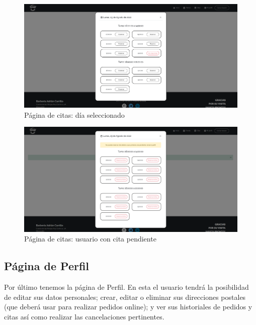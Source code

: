 \begin{figure}[H]
  \centering
  \includegraphics[scale=0.2]{images/front-end-appointment-2.png}
  \caption{Página de citas: día seleccionado}
  \label{}
\end{figure}

\begin{figure}[H]
  \centering
  \includegraphics[scale=0.2]{images/front-end-appointment-3.png}
  \caption{Página de citas: usuario con cita pendiente}
  \label{}
\end{figure}

\subsection{Página de Perfil}

Por último tenemos la página de Perfil. En esta el usuario tendrá la posibilidad de editar sus datos personales; crear, editar o eliminar sus direcciones postales (que deberá usar para realizar pedidos online); y ver sus historiales de pedidos y citas así como realizar las cancelaciones pertinentes.

